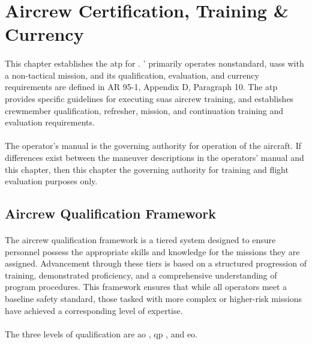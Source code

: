 \chapter{\texorpdfstring{Aircrew Certification, Training \& Currency}{Aircrew Certification, Training, and Currency}}
\label{ch:certification}

        \subsubsection{} This chapter establishes the \acf{atp} for \projectmars{}.  \projectmars{}' primarily operates nonstandard, \ac{uas}s with a non-tactical mission, and its qualification, evaluation, and currency requirements are defined in AR 95-1, Appendix D, Paragraph 10.  The \projectmars{} \ac{atp} provides specific guidelines for executing \ac{suas} aircrew training, and establishes crewmember qualification, refresher, mission, and continuation training and evaluation requirements.

        \subsubsection{} The operator’s manual is the governing authority for operation of the aircraft. If differences exist between the maneuver descriptions in the operators’ manual and this chapter, then this chapter the governing authority for training and flight evaluation purposes only. 

    \section{Aircrew Qualification Framework}\label{sec:qual-framework}

        \subsubsection{} The \projectmars{} aircrew qualification framework is a tiered system designed to ensure personnel possess the appropriate skills and knowledge for the missions they are assigned. Advancement through these tiers is based on a structured progression of training, demonstrated proficiency, and a comprehensive understanding of program procedures. This framework ensures that while all operators meet a baseline safety standard, those tasked with more complex or higher-risk missions have achieved a corresponding level of expertise.

        \subsubsection{} The three levels of qualification are \acf{ao} , \acf{qp} , and \acf{eo}. 


